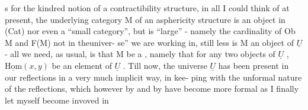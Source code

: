  \hand{(}s for the kindred notion of a contractibility structure, in all  
I could think of at present, the underlying category M of an asphericity
structure is \hand{\uline{\textcolor{black}{not}}} an object in (Cat) nor even a ``small category'', but is
``large'' - namely the cardinality of Ob M and F(M)  not in theuniver-%
se'' we are working in,  still less is M an object of $\underline{U}$ -
all we need, as usual, is that M be a , namely that for any
two objects of $\underline{U}$ , $\underline{\mathrm{Hom}}(x,y)$ be an element of $\underline{U}$ . Till now, the universe
$\underline{U}$ has been present in our reflections in a very much implicit way, in kee-%
ping with the unformal nature of the reflections, which however by and by
have become more formal\deleted{,} \hand{(}as I finally let myself become invoved in
